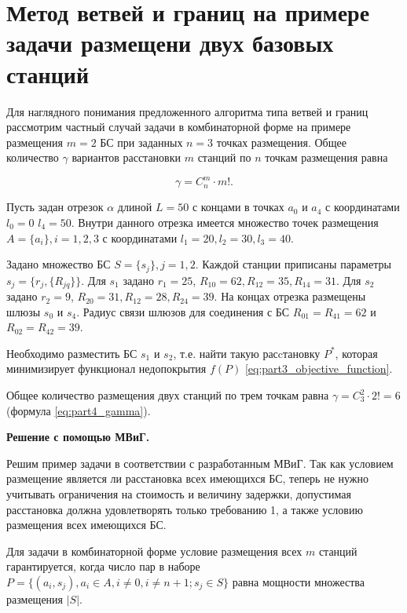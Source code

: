 
\FloatBarrier
\section{Метод ветвей и границ на примере задачи размещени двух базовых станций}\label{part4:bnb_algorithm}

Для наглядного понимания предложенного алгоритма типа ветвей и границ рассмотрим частный случай задачи в комбинаторной форме на примере размещения $m = 2$ БС при заданных $n = 3$ точках размещения.  Общее количество $\gamma$ вариантов расстановки $m$ станций по $n$ точкам размещения равна 

\begin{equation}
  \label{eq:part4_gamma}
  \gamma = C^m_n \cdot m! .
\end{equation}



Пусть задан отрезок $\alpha$ длиной $L = 50$ с концами в точках $a_0$ и $a_4$ с координатами $l_0 = 0$ $l_4 = 50$. Внутри данного отрезка имеется множество точек размещения $A = \{a_i\}, i = 1, 2, 3$ с координатами $l_1 = 20, l_2 = 30, l_3 = 40$. 

Задано множество БС $S = \{ s_j \} , j = 1, 2$. Каждой станции приписаны параметры $s_j = \{ r_j, \{R_{jq}\}\}$.  Для $s_1$ задано $r_1 = 25$, $R_{10} = 62, R_{12} = 35, R_{14} = 31$. Для $s_2$ задано $r_2 = 9$, $R_{20} = 31, R_{12} = 28, R_{24} = 39$.
На концах отрезка размещены шлюзы $s_0$ и $s_4$. Радиус связи шлюзов для соединения с БС $R_{01} = R_{41} = 62$ и $R_{02} = R_{42} = 39$. 


Необходимо разместить БС $s_1$ и $s_2$, т.е. найти такую расcтановку $P^*$, которая минимизирует функционал недопокрытия $f(P)$ \cref{eq:part3_objective_function}.

Общее количество размещения двух станций по трем точкам равна $\gamma = C^2_3 \cdot 2! = 6$ (формула \cref{eq:part4_gamma}).

\textbf{Решение с помощью МВиГ.}

Решим пример задачи в соответствии с разработанным МВиГ. Так как  условием размещение является ли расстановка всех имеющихся БС, теперь не нужно учитывать ограничения на стоимость и величину задержки, допустимая расстановка должна удовлетворять только требованию 1, а также условию размещения всех имеющихся БС.

Для задачи в комбинаторной форме условие размещения всех $m$ станций гарантируется, когда число пар в наборе $P = \{ (a_i, s_j), a_i \in A, i \neq 0, i \neq n + 1; s_j \in S\}$ равна мощности множества размещения $|S|$. 

